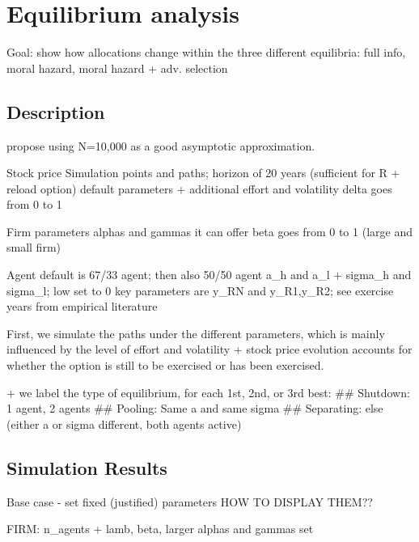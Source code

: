 \section{Equilibrium analysis}







Goal: show how allocations change within the three different equilibria: full info, moral hazard, moral hazard + adv. selection 





\subsection*{Description}
\cite{dai2005valuing} propose using N=10,000 as a good asymptotic approximation.

Stock price Simulation
    points and paths; horizon of 20 years (sufficient for R + reload option)
    default parameters + additional effort and volatility
    delta goes from 0 to 1

Firm parameters
    alphas and gammas it can offer
    beta goes from 0 to 1 (large and small firm)

Agent
    default is 67/33 agent; then also 50/50 agent
    a_h and a_l + sigma_h and sigma_l; low set to 0
    key parameters are y_RN and y_R1,y_R2; see exercise years from empirical literature


First, we simulate the paths under the different parameters, which is mainly influenced by the level of effort and volatility + stock price evolution accounts for whether the option is still to be exercised or has been exercised.




+ we label the type of equilibrium, for each 1st, 2nd, or 3rd best:
## Shutdown: 1 agent, 2 agents
## Pooling: Same a and same sigma
## Separating: else (either a or sigma different, both agents active)

\subsection*{Simulation Results} 
Base case - set fixed (justified) parameters
HOW TO DISPLAY THEM??

    FIRM: n_agents + lamb, beta, larger alphas and gammas set

